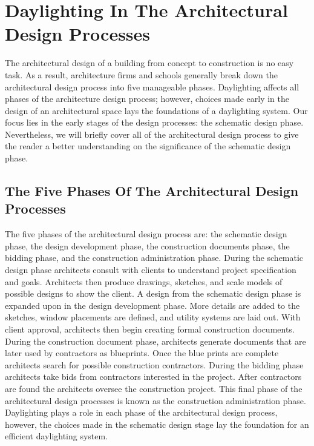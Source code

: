 \section{Daylighting In The Architectural Design Processes}

  The architectural design of a building from concept to construction is no easy task.
  As a result, architecture firms and schools generally break down the architectural design process into five manageable phases\cite{bazjanac1974architectural}.
  Daylighting affects all phases of the architecture design process; however, choices made early in the design of an architectural space lays the foundations of a daylighting system.
  Our focus lies in the early stages of the design processes: the schematic design phase.
  Nevertheless, we will briefly cover all of the architectural design process to give the reader a better understanding on the significance of the schematic design phase.

  \subsection{The Five Phases Of The Architectural Design Processes} 
  The five phases of the architectural design process are: the schematic design phase, the design development phase, the construction documents phase, the bidding phase, and the construction administration phase.
  During the schematic design phase architects consult with clients to understand project specification and goals. Architects then produce drawings, sketches, and scale models of possible designs to show the client.
  A design from the schematic design phase is expanded upon in the design development phase.
  More details are added to the sketches, window placements are defined, and utility systems are laid out.
  With client approval, architects then begin creating formal construction documents. During the construction document phase, architects generate documents that are later used by contractors as blueprints.
  Once the blue prints are complete architects search for possible construction contractors.
  During the bidding phase architects take bids from contractors interested in the project.
  After contractors are found the architects oversee the construction project.
  This final phase of the architectural design processes is known as the construction administration phase.
  Daylighting plays a role in each phase of the architectural design process, however, the choices made in the schematic design stage lay the foundation for an efficient daylighting system.

